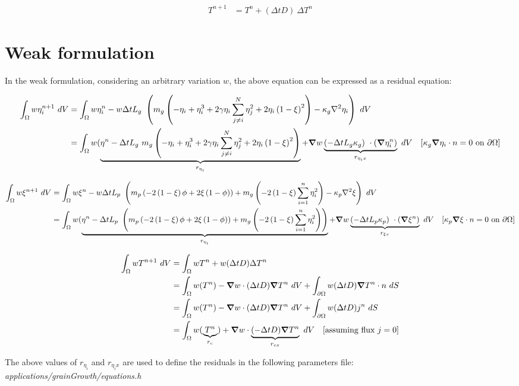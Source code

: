 \documentclass[10pt]{article}
\newcommand{\gv}[1]{\ensuremath{\mbox{\boldmath$ #1 $}}}
\newcommand{\grad}[1]{\gv{\nabla} #1}
\begin{document}
 \begin{align}
 T^{n+1} &= T^{n} + (\Delta t D)~\Delta T^n 
\end{align}

\section{Weak formulation}
In the weak formulation, considering an arbitrary variation $w$, the above equation can be expressed as a residual equation:

\begin{align}
\int_{\Omega}   w \eta_i^{n+1} ~dV&= \int_{\Omega}   w \eta_i^{n} - w \Delta t L_g~\left( m_g \left( -\eta_i + \eta_i^3 + 2 \gamma \eta_i \sum_{j \ne i}^N \eta_j^2 +2\eta_i\left( 1-\xi \right)^2  \right) - \kappa_g \nabla^2 \eta_i \right)~dV \\
&= \int_{\Omega}   w ( \underbrace{ \eta^{n} - \Delta t L_g~m_g \left( -\eta_i + \eta_i^3 + 2 \gamma \eta_i \sum_{j \ne i}^N \eta_j^2 +2\eta_i\left( 1-\xi \right)^2  \right) }_{r_{\eta_i}} + \grad w \underbrace{ (-\Delta t L_g \kappa_g)~ \cdot (\grad \eta_i^{n})}_{r_{\eta_i x}} ~dV \quad [\kappa_g \grad \eta_i \cdot n = 0 ~ \text{on} ~ \partial \Omega]
\end{align}

\begin{align}
\int_{\Omega}   w \xi^{n+1} ~dV&= \int_{\Omega}   w \xi^{n} - w \Delta t L_p~\left( m_p \left(  -2 \left( 1- \xi \right) \phi +2 \xi \left( 1- \phi \right)  \right) + m_g \left( -2 \left( 1-\xi \right) \sum_{i=1}^{n} \eta_i^2 \right) - \kappa_p \nabla^2 \xi \right)~dV \\
&= \int_{\Omega}   w ( \underbrace{ \eta^{n} - \Delta t L_p~\left( m_p \left(  -2 \left( 1- \xi \right) \phi +2 \xi \left( 1- \phi \right)  \right) + m_g \left( -2 \left( 1-\xi \right) \sum_{i=1}^{n} \eta_i^2 \right) \right) }_{r_{\eta_i}} + \grad w \underbrace{ (-\Delta t L_p \kappa_p)~ \cdot (\grad \xi^{n})}_{r_{\xi x}} ~dV \quad [\kappa_p \grad \xi \cdot n = 0 ~ \text{on} ~ \partial \Omega]
\end{align}

\begin{align}
\int_{\Omega}   w T^{n+1} ~dV &= \int_{\Omega}   w T^{n} + w (\Delta t D) \Delta T^n  \\
&= \int_{\Omega}   w (T^{n}) - \grad w  \cdot (\Delta t D) \grad T^n ~dV + \int_{\partial \Omega}   w  (\Delta t D) \grad T^n \cdot n ~dS\\
&= \int_{\Omega}   w (T^{n}) - \grad w  \cdot (\Delta t D) \grad T^n ~dV + \int_{\partial \Omega}   w  (\Delta t D) j^n  ~dS\\
&= \int_{\Omega}   w (\underbrace{T^{n}}_{r_c}) + \grad w  \cdot \underbrace{(-\Delta t D) \grad T^n}_{r_{cx}} ~dV \quad [\text {assuming flux}~j=0 ]
\end{align} 

\vskip 0.25in
The above values of  $r_{\eta_i}$ and $r_{\eta_i x}$ are used to define the residuals in the following parameters file: \\
\textit{applications/grainGrowth/equations.h}
\end{document}
